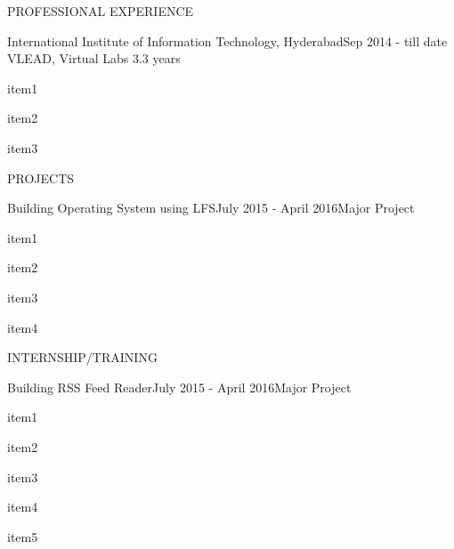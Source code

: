 \documentclass{resume} %
\begin{document}
\begin{rSection}{PROFESSIONAL EXPERIENCE}

   \begin{rSubsection}
    {International Institute of Information Technology, Hyderabad}{Sep 2014 -
      till date}
    {VLEAD, Virtual Labs} {3.3 years}
  \item item1
  \item item2
  \item item3
    
  \end{rSubsection}

\end{rSection}





\begin{rSection}{PROJECTS}

  \begin{rSubsection}
    {Building Operating System using LFS}{July 2015 - April 2016}{Major Project}{}
  \item item1
  \item item2
  \item item3
  \item item4
 
  \end{rSubsection} 

\end{rSection} 


\begin{rSection}{INTERNSHIP/TRAINING}

  \begin{rSubsection}
    {Building RSS Feed Reader}{July 2015 - April 2016}{Major Project}{}
  \item item1
  \item item2
  \item item3
  \item item4
  \item item5
 
  \end{rSubsection} 

\end{rSection} 


\end{document}

